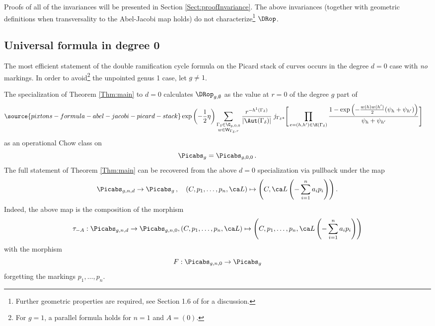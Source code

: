 Proofs of all of the invariances
will be presented in Section \ref{Sect:proofInvariance}.
The above invariances (together with geometric definitions
when transversality to the Abel-Jacobi map holds)  do not
characterize{\footnote {Further geometric properties are
required, see Section 1.6 of \cite{HolSch} for a discussion.}}
$\DRop$.

\subsection{Universal formula in degree 0}\label{sec:intro_deg_0}
The most efficient statement of the double ramification cycle formula
on the Picard stack of curves occurs in the degree $d=0$ case with {\em no} markings.
In order to avoid{\footnote{For $g=1$, a parallel formula holds for $n=1$ and $A=(0)$.}} the unpointed genus 1 case, let $g\neq 1$.


The specialization of Theorem \ref{Thm:main} to $d=0$ calculates $\DRop_{g,\emptyset}$ as
the value at $r=0$ of the degree $g$ part of
\begin{align*} %
\source{pixtons-formula-abel-jacobi-picard-stack}
\exp\left(-\frac12 \eta \right) \sum_{
\substack{\Gamma_\delta\in \G_{g,0,0} \\
w\in \mathsf{W}_{\Gamma_\delta,r}}
}
\frac{r^{-h^1(\Gamma_\delta)}}{|\Aut(\Gamma_\delta)| }
\;
j_{\Gamma_\delta*}\Bigg[&
\prod_{e=(h,h')\in \E(\Gamma_\delta)}
\frac{1-\exp\left(-\frac{w(h)w(h')}2(\psi_h+\psi_{h'})\right)}{\psi_h + \psi_{h'}} \Bigg]\,  %
\end{align*}
as an operational Chow class on
$$\Picabs_g=\Picabs_{g,0,0}\, .$$
The full
statement of Theorem \ref{Thm:main} can
be recovered from the above $d=0$ specialization via pullback under the map
\[\Picabs_{g,n,d} \to \Picabs_{g}\, ,\ \ \  (C,p_1, \ldots, p_n, \ca L) \mapsto \left(C, \ca L\left(-\sum_{i=1}^n a_i p_i\right)\right).\]
Indeed, the above map is the composition of the morphism
\[\tau_{-A} : \Picabs_{g,n,d} \to \Picabs_{g,n,0}, (C,p_1, \ldots, p_n, \ca L) \mapsto \left(C, p_1, \ldots, p_n, \ca L\left(-\sum_{i=1}^n a_i p_i\right)\right)\]
with the morphism $$F : \Picabs_{g,n,0} \to \Picabs_{g}$$ forgetting the markings $p_1, \ldots, p_n$.


